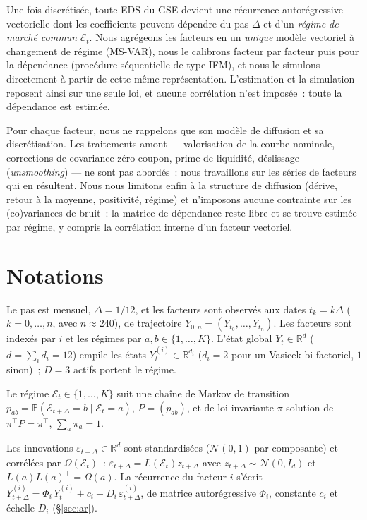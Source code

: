 \documentclass[11pt,a4paper]{article}
\theoremstyle{definition}
\newcommand{\R}{\mathbb{R}}
\newcommand{\Prob}{\mathbb{P}}
\newcommand{\Ecal}{\mathcal{E}}
\newcommand{\Ncal}{\mathcal{N}}
\newcommand{\eps}{\varepsilon}
\newcommand{\transp}{^{\!\top}}
\newcommand{\Dt}{\Delta}
\begin{document}
\begin{insightbox}
Une fois discrétisée, toute EDS du GSE devient une récurrence autorégressive vectorielle dont les coefficients peuvent dépendre du pas $\Dt$ et d'un \emph{régime de marché commun} $\Ecal_t$. Nous agrégeons les facteurs en un \emph{unique} modèle vectoriel à changement de régime (MS-VAR), nous le calibrons facteur par facteur puis pour la dépendance (procédure séquentielle de type IFM), et nous le simulons directement à partir de cette même représentation. L'estimation et la simulation reposent ainsi sur une seule loi, et aucune corrélation n'est imposée~: toute la dépendance est estimée.
\end{insightbox}

\noindent Pour chaque facteur, nous ne rappelons que son modèle de diffusion et sa discrétisation. Les traitements amont --- valorisation de la courbe nominale, corrections de covariance zéro-coupon, prime de liquidité, déslissage (\emph{unsmoothing}) --- ne sont pas abordés~: nous travaillons sur les séries de facteurs qui en résultent. Nous nous limitons enfin à la structure de diffusion (dérive, retour à la moyenne, positivité, régime) et n'imposons aucune contrainte sur les (co)variances de bruit~: la matrice de dépendance reste libre et se trouve estimée par régime, y compris la corrélation interne d'un facteur vectoriel.

\section{Notations}
\label{sec:notations}
Le pas est mensuel, $\Dt=1/12$, et les facteurs sont observés aux dates $t_k=k\Dt$ ($k=0,\dots,n$, avec $n\approx240$), de trajectoire $Y_{0:n}=(Y_{t_0},\dots,Y_{t_n})$. Les facteurs sont indexés par $i$ et les régimes par $a,b\in\{1,\dots,K\}$. L'état global $Y_t\in\R^{d}$ ($d=\sum_i d_i=12$) empile les états $Y^{(i)}_t\in\R^{d_i}$ ($d_i=2$ pour un Vasicek bi-factoriel, $1$ sinon)~; $D=3$ actifs portent le régime.

Le régime $\Ecal_t\in\{1,\dots,K\}$ suit une chaîne de Markov de transition $p_{ab}=\Prob(\Ecal_{t+\Dt}=b\mid\Ecal_t=a)$, $P=(p_{ab})$, et de loi invariante $\pi$ solution de $\pi\transp P=\pi\transp$, $\sum_a\pi_a=1$.

Les innovations $\eps_{t+\Dt}\in\R^d$ sont standardisées ($\Ncal(0,1)$ par composante) et corrélées par $\Omega(\Ecal_t)$~: $\eps_{t+\Dt}=L(\Ecal_t)z_{t+\Dt}$ avec $z_{t+\Dt}\sim\Ncal(0,I_d)$ et $L(a)L(a)\transp=\Omega(a)$. La récurrence du facteur $i$ s'écrit $Y^{(i)}_{t+\Dt}=\Phi_i\,Y^{(i)}_t+c_i+D_i\,\eps^{(i)}_{t+\Dt}$, de matrice autorégressive $\Phi_i$, constante $c_i$ et échelle $D_i$ (\S\ref{sec:ar}).
\end{document}
